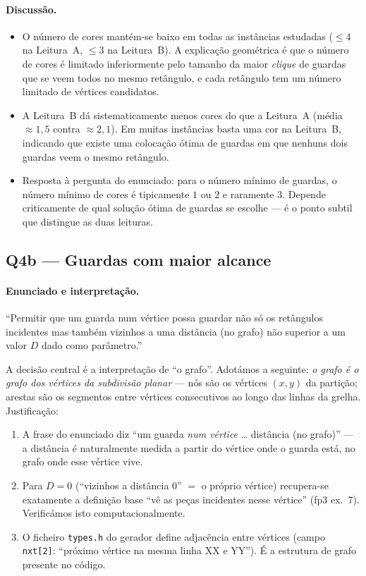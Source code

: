 \documentclass[11pt,a4paper]{article}
\begin{document}
\paragraph{Discussão.}
\begin{itemize}[topsep=2pt,itemsep=0pt]
  \item O número de cores mantém-se baixo em todas as instâncias
    estudadas ($\le 4$ na Leitura~A, $\le 3$ na Leitura~B). A
    explicação geométrica é que o número de cores é limitado
    inferiormente pelo tamanho da maior \emph{clique} de guardas que
    se veem todos no mesmo retângulo, e cada retângulo tem um número
    limitado de vértices candidatos.

  \item A Leitura~B dá sistematicamente menos cores do que a Leitura~A
    (média $\approx 1{,}5$ contra $\approx 2{,}1$). Em muitas instâncias
    basta uma cor na Leitura~B, indicando que existe uma colocação
    ótima de guardas em que nenhuns dois guardas veem o mesmo retângulo.

  \item Resposta à pergunta do enunciado: para o número mínimo de
    guardas, o número mínimo de cores é tipicamente $1$ ou $2$ e
    raramente $3$. Depende criticamente de qual solução ótima de
    guardas se escolhe --- é o ponto subtil que distingue as duas
    leituras.
\end{itemize}

\subsection{Q4b --- Guardas com maior alcance}

\paragraph{Enunciado e interpretação.}
``Permitir que um guarda num vértice possa guardar não só os
retângulos incidentes mas também vizinhos a uma distância (no grafo)
não superior a um valor $D$ dado como parâmetro.''

A decisão central é a interpretação de ``o grafo''. Adotámos a
seguinte: \emph{o grafo é o grafo dos vértices da subdivisão planar}
--- nós são os vértices $(x,y)$ da partição; arestas são os
segmentos entre vértices consecutivos ao longo das linhas da grelha.
Justificação:
\begin{enumerate}[noitemsep,topsep=2pt]
  \item A frase do enunciado diz ``um guarda \emph{num vértice} \dots
    distância (no grafo)'' --- a distância é naturalmente medida a
    partir do vértice onde o guarda está, no grafo onde esse
    vértice vive.
  \item Para $D=0$ (``vizinhos a distância 0'' $=$ o próprio vértice)
    recupera-se exatamente a definição base ``vê as peças incidentes
    nesse vértice'' (fp3 ex.~7). Verificámos isto computacionalmente.
  \item O ficheiro \texttt{types.h} do gerador define adjacência entre
    vértices (campo \texttt{nxt[2]}: ``próximo vértice na mesma linha
    XX e YY''). É a estrutura de grafo presente no código.
\end{enumerate}
\end{document}
